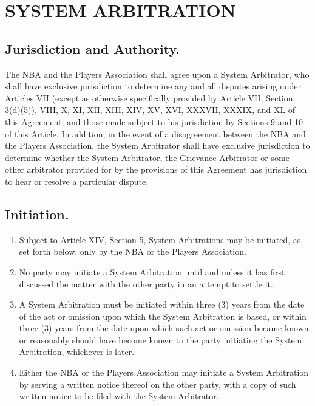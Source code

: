\documentclass[
]{book}
\providecommand{\tightlist}{%
  \setlength{\itemsep}{0pt}\setlength{\parskip}{0pt}}
\begin{document}
\hypertarget{system-arbitration}{%
\chapter{SYSTEM ARBITRATION}\label{system-arbitration}}

\hypertarget{jurisdiction-and-authority.}{%
\section{Jurisdiction and Authority.}\label{jurisdiction-and-authority.}}

The NBA and the Players Association shall agree upon a System Arbitrator, who shall have exclusive jurisdiction to determine any and all disputes arising under Articles VII (except as otherwise specifically provided by Article VII, Section 3(d)(5)), VIII, X, XI, XII, XIII, XIV, XV, XVI, XXXVII, XXXIX, and XL of this Agreement, and those made subject to his jurisdiction by Sections 9 and 10 of this Article. In addition, in the event of a disagreement between the NBA and the Players Association, the System Arbitrator shall have exclusive jurisdiction to determine whether the System Arbitrator, the Grievance Arbitrator or some other arbitrator provided for by the provisions of this Agreement has jurisdiction to hear or resolve a particular dispute.

\hypertarget{initiation.-1}{%
\section{Initiation.}\label{initiation.-1}}

\begin{enumerate}
\def\labelenumi{(\alph{enumi})}
\tightlist
\item
  Subject to Article XIV, Section 5, System Arbitrations may be initiated, as set forth below, only by the NBA or the Players Association.
\item
  No party may initiate a System Arbitration until and unless it has first discussed the matter with the other party in an attempt to settle it.
\item
  A System Arbitration must be initiated within three (3) years from the date of the act or omission upon which the System Arbitration is based, or within three (3) years from the date upon which such act or omission became known or reasonably should have become known to the party initiating the System Arbitration, whichever is later.
\item
  Either the NBA or the Players Association may initiate a System Arbitration by serving a written notice thereof on the other party, with a copy of such written notice to be filed with the System Arbitrator.
\end{enumerate}
\end{document}
